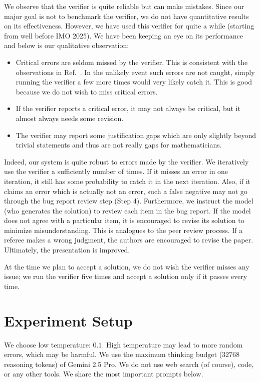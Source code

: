 \documentclass[12pt]{article}
\begin{document}
We observe that the verifier is quite reliable but can make mistakes. Since our major goal is not to benchmark the verifier, we do not have quantitative results on its effectiveness. However, we have used this verifier for quite a while (starting from well before IMO 2025). We have been keeping an eye on its performance and below is our qualitative observation:
\begin{itemize}
    \item Critical errors are seldom missed by the verifier. This is consistent with the observations in Ref.~\cite{SLJ15}. In the unlikely event such errors are not caught, simply running the verifier a few more times would very likely catch it. This is good because we do not wish to miss critical errors.
    \item If the verifier reports a critical error, it may not always be critical, but it almost always needs some revision.
    \item The verifier may report some justification gaps which are only slightly beyond trivial statements and thus are not really gaps for mathematicians.
\end{itemize}
Indeed, our system is quite robust to errors made by the verifier. We iteratively use the verifier a sufficiently number of times. If it misses an error in one iteration, it still has some probability to catch it in the next iteration. Also, if it claims an error which is actually not an error, such a false negative may not go through the bug report review step (Step 4). Furthermore, we instruct the model (who generates the solution) to review each item in the bug report. If the model does not agree with a particular item, it is encouraged to revise its solution to minimize misunderstanding. This is analogues to the peer review process. If a referee makes a wrong judgment, the authors are encouraged to revise the paper. Ultimately, the presentation is improved.

At the time we plan to accept a solution, we do not wish the verifier misses any issue; we run the verifier five times and accept a solution only if it passes every time.

\section{Experiment Setup}
We choose low temperature: $0.1$. High temperature may lead to more random errors, which may be harmful. We use the maximum thinking budget ($32768$ reasoning tokens) of Gemini 2.5 Pro. We do not use web search (of course), code, or any other tools. We share the most important prompts below.
\end{document}

